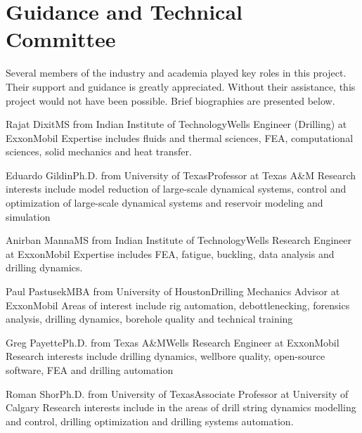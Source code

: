 \section{Guidance and Technical Committee}
Several members of the industry and academia played key roles in this project.  Their support and guidance is greatly appreciated.  Without their assistance, this project would not have been possible.  Brief biographies are presented below.

\begin{committeemember}{Rajat Dixit}{MS from Indian Institute of Technology}{Wells Engineer (Drilling) at ExxonMobil}
Expertise includes fluids and thermal sciences, FEA, computational sciences, solid mechanics and heat transfer.
\end{committeemember}

\begin{committeemember}{Eduardo Gildin}{Ph.D. from University of Texas}{Professor at Texas A\&M}
Research interests include model reduction of large-scale dynamical systems, control and optimization of large-scale dynamical systems and reservoir modeling and simulation
\end{committeemember}

\begin{committeemember}{Anirban Manna}{MS from Indian Institute of Technology}{Wells Research Engineer at ExxonMobil}
Expertise includes FEA, fatigue, buckling, data analysis and drilling dynamics.
\end{committeemember}

\begin{committeemember}{Paul Pastusek}{MBA from University of Houston}{Drilling Mechanics Advisor at ExxonMobil}
Areas of interest include rig automation, debottlenecking, forensics analysis, drilling dynamics, borehole quality and technical training
\end{committeemember}

\begin{committeemember}{Greg Payette}{Ph.D. from Texas A\&M}{Wells Research Engineer at ExxonMobil}
Research interests include drilling dynamics, wellbore quality, open-source software, FEA and drilling automation
\end{committeemember}

\begin{committeemember}{Roman Shor}{Ph.D. from University of Texas}{Associate Professor at University of Calgary}
Research interests include in the areas of drill string dynamics modelling and control, drilling optimization and drilling systems automation.
\end{committeemember} 